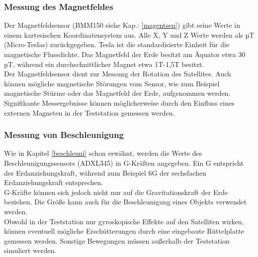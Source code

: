 \subsubsection{Messung des Magnetfeldes}
Der Magnetfeldsensor (BMM150 siehe Kap.: \ref{magentsen}) gibt seine Werte in einem kartesischen Koordinatensystem aus. Alle X, Y und Z Werte werden als µT (Micro-Teslas) zurückgegeben. Tesla ist die standardisierte Einheit für die magnetische Flussdichte. Das Magnetfeld der Erde besitzt am Äquator etwa 30 µT\autocite{Erdmagnetfeld}, während ein durchschnittlicher Magnet etwa 1T-1,5T besitzt.\\
\vspace{3mm}
Der Magnetfeldsensor dient zur Messung der Rotation des Satellites. Auch können mögliche magnetische Störungen vom Sensor, wie zum Beispiel magnetische Stürme oder das Magnetfeld der Erde, aufgenommen werden.\\
\vspace{3mm}
Signifikante Messergebnisse können möglicherweise durch den Einfluss eines externen Magneten in der Teststation gemessen werden.
\newpage
\subsubsection{Messung von Beschleunigung}
Wie in Kapitel \ref{beschleuni} schon erwähnt, werden die Werte des Beschleunigungssensors (ADXL345) in G-Kräften angegeben. Ein G entspricht der Erdanziehungskraft, während zum Beispiel 6G der sechsfachen Erdanziehungskraft entsprechen. \\
\vspace{3mm}
G-Kräfte können sich jedoch nicht nur auf die Gravitationskraft der Erde beziehen. Die Größe kann auch für die Beschleunigung eines Objekts verwendet werden. \\
\vspace{3mm}
Obwohl in der Teststation nur gyroskopische Effekte auf den Satelliten wirken, können eventuell mögliche Erschütterungen durch eine eingebaute Rüttelplatte gemessen werden. Sonstige Bewegungen müssen außerhalb der Teststation simuliert werden.

